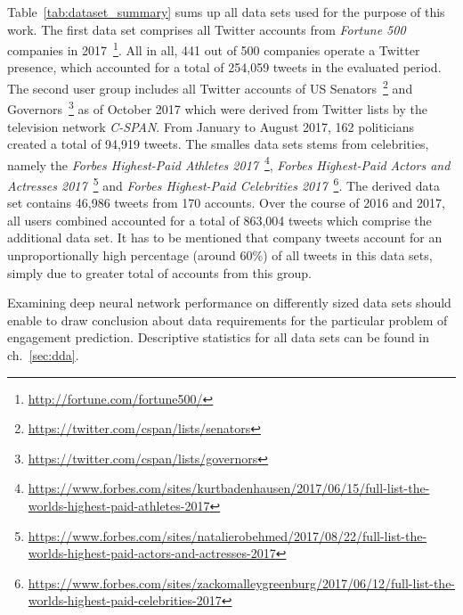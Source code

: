 Table~\ref{tab:dataset_summary} sums up all data sets used for the purpose of
this work.
The first data set comprises all Twitter accounts from \textit{Fortune 500}
companies in 2017~\footnote{\url{http://fortune.com/fortune500/}}.
All in all, 441 out of 500 companies operate a Twitter presence, which accounted
for a total of 254,059 tweets in the evaluated period.
The second user group includes all Twitter accounts of US Senators~\footnote{\url{https://twitter.com/cspan/lists/senators}} and Governors~\footnote{\url{https://twitter.com/cspan/lists/governors}}
as of October 2017 which were derived from Twitter lists by the television
network \textit{C-SPAN}.
From January to August 2017, 162 politicians created a total of 94,919 tweets.
The smalles data sets stems from celebrities, namely the \textit{Forbes Highest-Paid
Athletes 2017}~\footnote{\url{https://www.forbes.com/sites/kurtbadenhausen/2017/06/15/full-list-the-worlds-highest-paid-athletes-2017}}, \textit{Forbes Highest-Paid Actors and Actresses 2017}~\footnote{\url{https://www.forbes.com/sites/natalierobehmed/2017/08/22/full-list-the-worlds-highest-paid-actors-and-actresses-2017}} and
\textit{Forbes Highest-Paid Celebrities 2017}~\footnote{\url{https://www.forbes.com/sites/zackomalleygreenburg/2017/06/12/full-list-the-worlds-highest-paid-celebrities-2017}}.
The derived data set contains 46,986 tweets from 170 accounts.
Over the course of 2016 and 2017, all users combined accounted for a total
of 863,004 tweets which comprise the additional data set.
It has to be mentioned that company tweets account for an unproportionally high
percentage (around 60\%) of all tweets in this data sets, simply due to greater
total of accounts from this group.

Examining deep neural network performance on differently sized data sets should
enable to draw conclusion about data requirements for the particular problem
of engagement prediction.
Descriptive statistics for all data sets can be found in ch.~\ref{sec:dda}.
